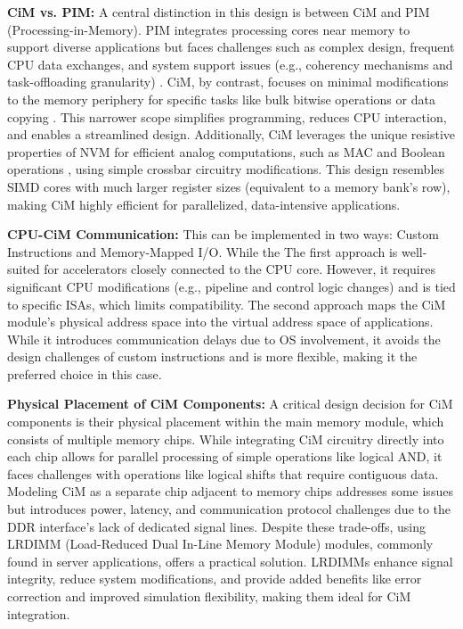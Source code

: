\textbf{CiM vs. PIM:}
A central distinction in this design is between CiM and PIM (Processing-in-Memory). PIM integrates processing cores near memory to support diverse applications but faces challenges such as complex design, frequent CPU data exchanges, and system support issues (e.g., coherency mechanisms and task-offloading granularity)  \cite{kit/ext1,kit/ext4,kit/ext5,kit/ext7}.
CiM, by contrast, focuses on minimal modifications to the memory periphery for specific tasks like bulk bitwise operations or data copying \cite{kit/rowclone}. This narrower scope simplifies programming, reduces CPU interaction, and enables a streamlined design. Additionally, CiM leverages the unique resistive properties of NVM for efficient analog computations, such as MAC and Boolean operations \cite{kit/ext4,kit/ext5,kit/ext8}, using simple crossbar circuitry modifications. This design resembles SIMD cores with much larger register sizes (equivalent to a memory bank’s row), making CiM highly efficient for parallelized, data-intensive applications.

\textbf{CPU-CiM Communication:}
This can be implemented in two ways:
 Custom Instructions and  Memory-Mapped I/O. While the The first approach is well-suited for accelerators closely connected to the CPU core. However, it requires significant CPU modifications (e.g., pipeline and control logic changes) and is tied to specific ISAs, which limits compatibility.
The second approach maps the CiM module’s physical address space into the virtual address space of applications. While it introduces communication delays due to OS involvement, it avoids the design challenges of custom instructions and is more flexible, making it the preferred choice in this case.

\textbf{Physical Placement of CiM Components:}
A critical design decision for CiM components is their physical placement within the main memory module, which consists of multiple memory chips. While integrating CiM circuitry directly into each chip allows for parallel processing of simple operations like logical AND, it faces challenges with operations like logical shifts that require contiguous data. Modeling CiM as a separate chip adjacent to memory chips addresses some issues but introduces power, latency, and communication protocol challenges due to the DDR interface’s lack of dedicated signal lines. Despite these trade-offs, using LRDIMM (Load-Reduced Dual In-Line Memory Module) modules, commonly found in server applications, offers a practical solution. LRDIMMs enhance signal integrity, reduce system modifications, and provide added benefits like error correction and improved simulation flexibility, making them ideal for CiM integration.

